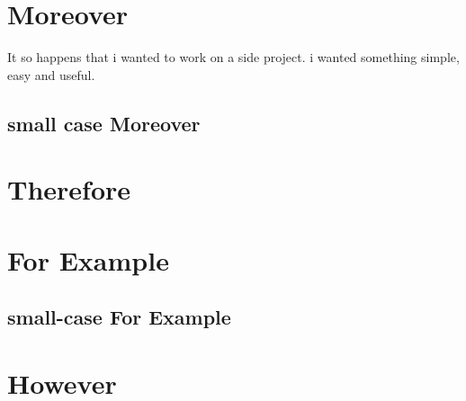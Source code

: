 \documentclass{article}
\begin{document}
\section{Moreover}

It so happens that i wanted to work on a side project. \Moreover i wanted something simple, easy and useful.

\Moreover

\Moreover

\Moreover

\Moreover

\subsection{small case Moreover}

\smallMoreover

\smallMoreover

\smallMoreover

\section{Therefore}

\Therefore 

\Therefore

\Therefore

\Therefore

\Therefore

\section{For Example}

\Forexample 

\Forexample

\Forexample

\Forexample

\Forexample

\subsection{small-case For Example} 

\smallForexample

\smallForexample

\smallForexample

\section{However}

\However

\However

\However

\However
\end{document}
